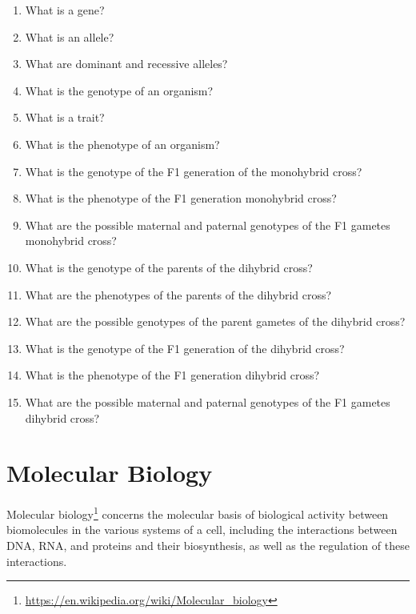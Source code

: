 \documentclass[]{book}
\providecommand{\tightlist}{%
  \setlength{\itemsep}{0pt}\setlength{\parskip}{0pt}}
\let\rmarkdownfootnote\footnote%
\def\footnote{\protect\rmarkdownfootnote}
\renewcommand{\href}[2]{#2\footnote{\url{#1}}}
\begin{document}
\begin{enumerate}
\def\labelenumi{\arabic{enumi}.}
\tightlist
\item
  What is a gene?
\item
  What is an allele?
\item
  What are dominant and recessive alleles?
\item
  What is the genotype of an organism?
\item
  What is a trait?
\item
  What is the phenotype of an organism?
\item
  What is the genotype of the F1 generation of the monohybrid cross?
\item
  What is the phenotype of the F1 generation monohybrid cross?
\item
  What are the possible maternal and paternal genotypes of the F1 gametes monohybrid cross?
\item
  What is the genotype of the parents of the dihybrid cross?
\item
  What are the phenotypes of the parents of the dihybrid cross?
\item
  What are the possible genotypes of the parent gametes of the dihybrid cross?
\item
  What is the genotype of the F1 generation of the dihybrid cross?
\item
  What is the phenotype of the F1 generation dihybrid cross?
\item
  What are the possible maternal and paternal genotypes of the F1 gametes dihybrid cross?
\end{enumerate}

\hypertarget{molecular-biology}{%
\chapter{Molecular Biology}\label{molecular-biology}}

\href{https://en.wikipedia.org/wiki/Molecular_biology}{Molecular biology} concerns the molecular basis of biological activity between biomolecules in the various systems of a cell, including the interactions between DNA, RNA, and proteins and their biosynthesis, as well as the regulation of these interactions.
\end{document}
